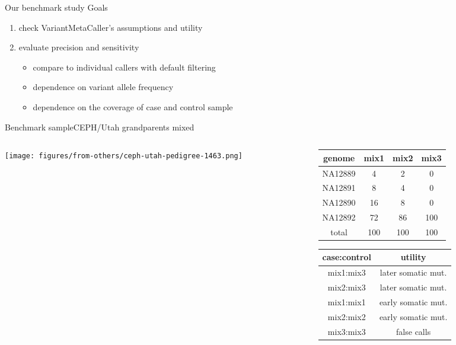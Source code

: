 \documentclass{beamer}
\begin{document}
\begin{frame}{Our benchmark study}
Goals
\begin{enumerate}
\item check VariantMetaCaller's assumptions and utility
\item evaluate precision and sensitivity
\begin{itemize}
\item compare to individual callers with default filtering
\item dependence on variant allele frequency 
\item dependence on the coverage of case and control sample 
\end{itemize}
\end{enumerate}
\end{frame}

\begin{frame}{Benchmark sample}{CEPH/Utah grandparents mixed}
\begin{center}
\begin{columns}[t]
\begin{column}{0.5\textwidth}

\texttt{[image: figures/from-others/ceph-utah-pedigree-1463.png]}
\end{column}

\begin{column}{0.5\textwidth}

\small
{
\begin{tabular}{cccc}
genome & mix1 & mix2 & mix3\\
\hline
NA12889 & 4 & 2 & 0\\
NA12891 & 8 & 4 & 0\\
NA12890 & 16 & 8 & 0\\
NA12892 & 72 & 86 & 100\\
\hline
total & 100 & 100 & 100\\
\end{tabular}
}
\vfill
{
\begin{tabular}{cc}
case:control & utility \\
\hline
\hline
mix1:mix3 & later somatic mut. \\
mix2:mix3 & later somatic mut. \\
\hline
mix1:mix1 & early somatic mut. \\
mix2:mix2 & early somatic mut. \\
\hline
mix3:mix3 & false calls \\
\end{tabular}
}
\end{column}
\end{columns}
\end{center}
\end{frame}
\end{document}
